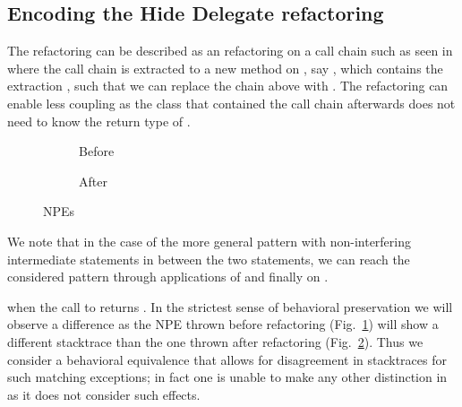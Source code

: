 \subsection{Encoding the Hide Delegate refactoring}\label{sec:hideDelegate}

The  refactoring can be described as an  refactoring on a call chain such as seen in 
where the call chain is extracted to a new method on , say , which contains the extraction , such that we can replace the chain above with .
The refactoring can enable less coupling as the class that contained the call chain afterwards does not need to know the return type of .

\begin{figure}[tbp]
  \centering
  \begin{subfigure}{.3\linewidth}
    
    \caption{Before}
    \label{fig:hd-npe-before}
  \end{subfigure}
  \begin{subfigure}{.3\linewidth}
    
    \caption{After}
    \label{fig:hd-npe-after}    
  \end{subfigure}
  \caption{NPEs}
  \label{fig:NPEs}
\end{figure}

We note that in the case of the more general pattern  with non-interfering intermediate statements in between the two statements,
we can reach the considered pattern through applications of  and finally  on .

 when the call to  returns .
In the strictest sense of behavioral preservation
we will observe a difference as the NPE thrown before refactoring (Fig.~\ref{fig:hd-npe-before}) will show a different stacktrace than the one thrown after refactoring (Fig.~\ref{fig:hd-npe-after}).
Thus we consider a behavioral equivalence that allows for disagreement in stacktraces for such matching exceptions; in fact one is unable to make any other distinction in \Refinity{}
as it does not consider such effects.


